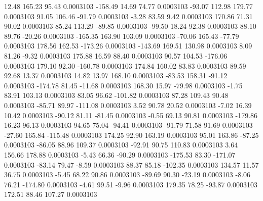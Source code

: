        12.48      165.23       95.43     0.0003103
     -158.49       14.69       74.77     0.0003103
      -93.07      112.98      179.77     0.0003103
       91.05      106.46      -91.79     0.0003103
       -3.28       83.59        9.42     0.0003103
      170.86       71.31       90.02     0.0003103
       85.24      113.29      -89.85     0.0003103
      -99.50       18.24       92.38     0.0003103
       88.10       89.76      -20.26     0.0003103
     -165.35      163.90      103.09     0.0003103
      -70.06      165.43      -77.79     0.0003103
      178.56      162.53     -173.26     0.0003103
     -143.69      169.51      130.98     0.0003103
        8.09       81.26       -9.32     0.0003103
      175.88       16.59       88.40     0.0003103
       90.57      104.53     -176.06     0.0003103
      179.10       92.30     -160.78     0.0003103
      174.84      160.02       83.83     0.0003103
       89.59       92.68       13.37     0.0003103
       14.82       13.97      168.10     0.0003103
      -83.53      158.31      -91.12     0.0003103
     -174.78       81.45      -11.68     0.0003103
      168.30       15.97      -79.98     0.0003103
       -1.75       83.91      103.13     0.0003103
       83.05       96.62     -101.82     0.0003103
       87.28      109.43       90.48     0.0003103
      -85.71       89.97     -111.08     0.0003103
        3.52       90.78       20.52     0.0003103
       -7.02       16.39       10.42     0.0003103
      -90.12       81.11      -81.45     0.0003103
       -0.55       69.13       90.81     0.0003103
     -179.86       16.23       96.13     0.0003103
       94.65       75.04      -94.41     0.0003103
      -91.79       71.58       91.69     0.0003103
      -27.60      165.84     -115.48     0.0003103
      174.25       92.90      163.19     0.0003103
       95.01      163.86      -87.25     0.0003103
      -86.05       88.96      109.37     0.0003103
      -92.91       90.75      110.83     0.0003103
        3.64      156.66      178.88     0.0003103
       -5.43       66.36      -90.29     0.0003103
     -175.53       83.30     -171.07     0.0003103
      -83.14       79.47       -8.59     0.0003103
       88.37       85.18     -102.35     0.0003103
      134.57       11.57       36.75     0.0003103
       -5.45       68.22       90.86     0.0003103
      -89.69       90.30      -23.19     0.0003103
       -8.06       76.21     -174.80     0.0003103
       -4.61       99.51       -9.96     0.0003103
      179.35       78.25      -93.87     0.0003103
      172.51       88.46      107.27     0.0003103
